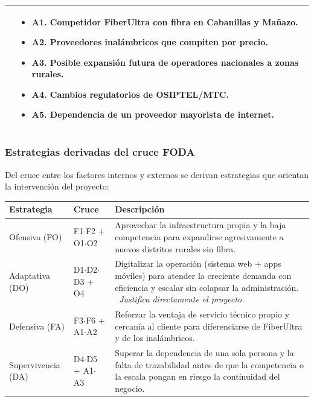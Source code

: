 \begin{center}
\begin{tabularx}{\textwidth}{X X}
\begin{itemize}[leftmargin=1.4em,nosep]
\end{itemize}
&
\begin{itemize}[leftmargin=1.4em,nosep]
  \item A1. Competidor FiberUltra con fibra en Cabanillas y Mañazo.
  \item A2. Proveedores inalámbricos que compiten por precio.
  \item A3. Posible expansión futura de operadores nacionales a zonas rurales.
  \item A4. Cambios regulatorios de OSIPTEL/MTC.
  \item A5. Dependencia de un proveedor mayorista de internet.
\end{itemize}
\\
\bottomrule
\end{tabularx}
\end{center}

\subsubsection{Estrategias derivadas del cruce FODA}

Del cruce entre los factores internos y externos se derivan estrategias que
orientan la intervención del proyecto:

\begin{center}
\label{tab:foda-cruce}
\begin{tabularx}{\textwidth}{L{2.7cm} L{2.5cm} X}
\toprule
\textbf{Estrategia} & \textbf{Cruce} & \textbf{Descripción} \\
\midrule
Ofensiva (FO) & F1$\cdot$F2 $+$ O1$\cdot$O2 &
Aprovechar la infraestructura propia y la baja competencia para expandirse
agresivamente a nuevos distritos rurales sin fibra. \\
Adaptativa (DO) & D1$\cdot$D2$\cdot$D3 $+$ O4 &
Digitalizar la operación (sistema web $+$ apps móviles) para atender la creciente
demanda con eficiencia y escalar sin colapsar la administración.
\textrightarrow{}~\textit{Justifica directamente el proyecto.} \\
Defensiva (FA) & F3$\cdot$F6 $+$ A1$\cdot$A2 &
Reforzar la ventaja de servicio técnico propio y cercanía al cliente para
diferenciarse de FiberUltra y de los inalámbricos. \\
Supervivencia (DA) & D4$\cdot$D5 $+$ A1$\cdot$A3 &
Superar la dependencia de una sola persona y la falta de trazabilidad antes de que
la competencia o la escala pongan en riesgo la continuidad del negocio. \\
\bottomrule
\end{tabularx}
\end{center}

